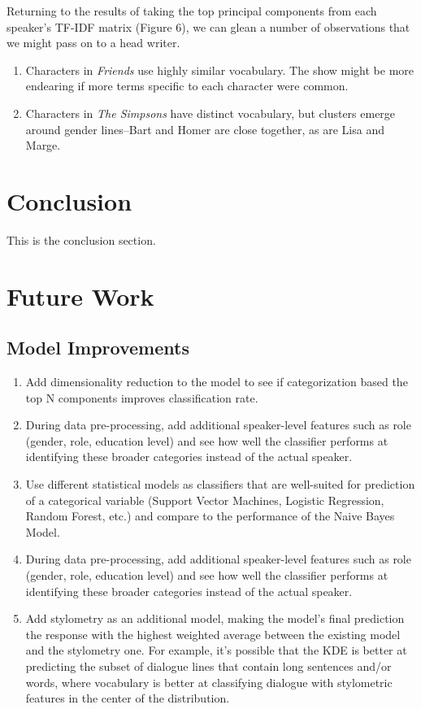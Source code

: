\documentclass{article}
\begin{document}
\begin{titlepage}
Returning to the results of taking the top principal components from each speaker's TF-IDF matrix (Figure 6), we can glean a number of observations that we might pass on to a head writer.

\begin{enumerate}
\item Characters in \textit{Friends} use highly similar vocabulary. The show might be more endearing if more terms specific to each character were common.
\item Characters in \textit{The Simpsons} have distinct vocabulary, but clusters emerge around gender lines–Bart and Homer are close together, as are Lisa and Marge. 
\end{enumerate}


\section{Conclusion}
This is the conclusion section.

\section{Future Work}
\subsection{Model Improvements}

\begin{enumerate}
\item Add dimensionality reduction to the model to see if categorization based the top N components improves classification rate.
\item During data pre-processing, add additional speaker-level features such as role (gender, role, education level) and see how well the classifier performs at identifying these broader categories instead of the actual speaker.
\item Use different statistical models as classifiers that are well-suited for prediction of a categorical variable (Support Vector Machines, Logistic Regression, Random Forest, etc.) and compare to the performance of the Naive Bayes Model.
\item During data pre-processing, add additional speaker-level features such as role (gender, role, education level) and see how well the classifier performs at identifying these broader categories instead of the actual speaker.
\item Add stylometry as an additional model, making the model's final prediction the response with the highest weighted average between the existing model and the stylometry one. For example, it's possible that the KDE is better at predicting the subset of dialogue lines that contain long sentences and/or words, where vocabulary is better at classifying dialogue with stylometric features in the center of the distribution.
\end{enumerate}


\end{titlepage}
\end{document}
